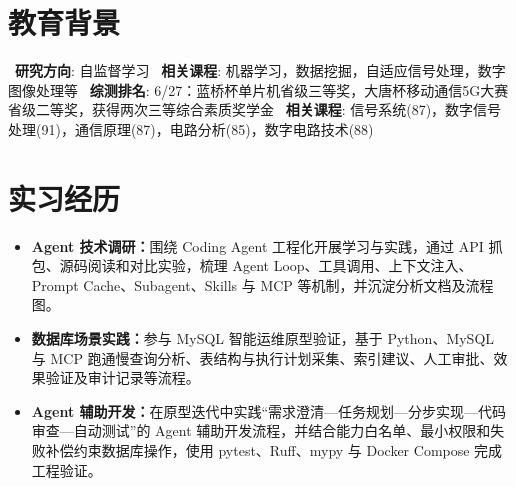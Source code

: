 \documentclass{resume}
\begin{document}


\section{教育背景}
\ \textbf{研究方向}: 自监督学习
\ \textbf{相关课程}: 机器学习，数据挖掘，自适应信号处理，数字图像处理等
\ \textbf{综测排名}: 6/27：蓝桥杯单片机省级三等奖，大唐杯移动通信5G大赛省级二等奖，获得两次三等综合素质奖学金
\ \textbf{相关课程}: 信号系统(87)，数字信号处理(91)，通信原理(87)，电路分析(85)，数字电路技术(88)

\section{实习经历}
\begin{itemize}
  \item \textbf{Agent 技术调研：}围绕 Coding Agent 工程化开展学习与实践，通过 API 抓包、源码阅读和对比实验，梳理 Agent Loop、工具调用、上下文注入、Prompt Cache、Subagent、Skills 与 MCP 等机制，并沉淀分析文档及流程图。
  \item \textbf{数据库场景实践：}参与 MySQL 智能运维原型验证，基于 Python、MySQL 与 MCP 跑通慢查询分析、表结构与执行计划采集、索引建议、人工审批、效果验证及审计记录等流程。
  \item \textbf{Agent 辅助开发：}在原型迭代中实践“需求澄清—任务规划—分步实现—代码审查—自动测试”的 Agent 辅助开发流程，并结合能力白名单、最小权限和失败补偿约束数据库操作，使用 pytest、Ruff、mypy 与 Docker Compose 完成工程验证。
\end{itemize}
\end{document}
